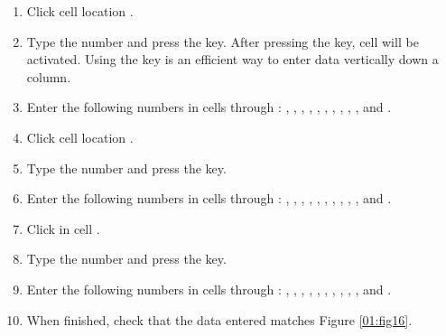 \begin{enumbox}
	\begin{enumerate}
		\item Click cell location .
		\item Type the number  and press the  key. After pressing the  key, cell  will be activated. Using the  key is an efficient way to enter data vertically down a column.
		\item Enter the following numbers in cells  through : , , , , , , , , , , and .
		\item Click cell location .
		\item Type the number  and press the  key.
		\item Enter the following numbers in cells  through : , , , , , , , , , , and .
		\item Click in cell .
		\item Type the number  and press the  key.
		\item Enter the following numbers in cells  through : , , , , , , , , , , and .
		\item When finished, check that the data entered matches Figure \ref{01:fig16}.
	\end{enumerate}
\end{enumbox}
	
